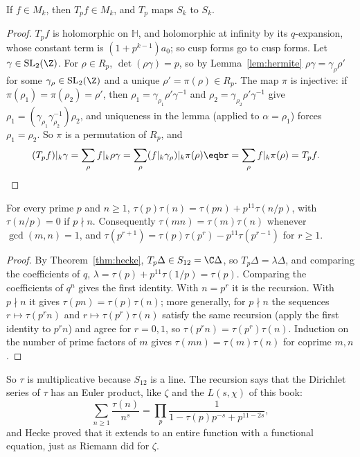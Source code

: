 \begin{theorem}[Hecke]\label{thm:hecke}
If $f\in M_k$, then $T_pf\in M_k$, and $T_p$ maps $S_k$ to $S_k$.
\end{theorem}

\begin{proof}
$T_pf$ is holomorphic on $\mathbb H$, and holomorphic at infinity by its $q$-expansion, whose constant term is $(1+p^{k-1})a_0$; so cusp forms go to cusp forms. Let $\gamma\in\mathrm{SL}_2(\Z)$. For $\rho\in R_p$, $\det(\rho\gamma)=p$, so by
Lemma~\ref{lem:hermite} $\rho\gamma=\gamma_\rho\rho'$ for some $\gamma_\rho\in\mathrm{SL}_2(\Z)$ and a unique $\rho'=\pi(\rho)\in R_p$. The map $\pi$ is injective: if $\pi(\rho_1)=\pi(\rho_2)=\rho'$, then $\rho_1=\gamma_{\rho_1}\rho'\gamma^{-1}$ and
$\rho_2=\gamma_{\rho_2}\rho'\gamma^{-1}$ give $\rho_1=(\gamma_{\rho_1}\gamma_{\rho_2}^{-1})\rho_2$, and uniqueness in the lemma (applied to $\alpha=\rho_1$) forces $\rho_1=\rho_2$. So $\pi$ is a permutation of $R_p$, and
\[
\begin{aligned}(T_pf)|_k\gamma&=\sum_\rho f|_k\rho\gamma=\sum_\rho(f|_k\gamma_\rho)|_k\pi(\rho)\eqbr=\sum_\rho f|_k\pi(\rho)=T_pf.\end{aligned}
\]
\end{proof}

\begin{theorem}[Mordell, 1917]\label{thm:mordell}
For every prime $p$ and $n\ge1$, $\tau(p)\tau(n)=\tau(pn)+p^{11}\tau(n/p)$, with $\tau(n/p)=0$ if $p\nmid n$. Consequently $\tau(mn)=\tau(m)\tau(n)$ whenever $\gcd(m,n)=1$, and
$\tau(p^{r+1})=\tau(p)\tau(p^r)-p^{11}\tau(p^{r-1})$ for $r\ge1$.
\end{theorem}

\begin{proof}
By Theorem~\ref{thm:hecke}, $T_p\Delta\in S_{12}=\C\Delta$, so $T_p\Delta=\lambda\Delta$, and comparing the coefficients of $q$, $\lambda=\tau(p)+p^{11}\tau(1/p)=\tau(p)$. Comparing the coefficients of $q^n$ gives the first identity.
With $n=p^r$ it is the recursion. With $p\nmid n$ it gives $\tau(pn)=\tau(p)\tau(n)$; more generally, for $p\nmid n$ the sequences $r\mapsto\tau(p^rn)$ and $r\mapsto\tau(p^r)\tau(n)$ satisfy the same recursion (apply the first identity to $p^rn$)
and agree for $r=0,1$, so $\tau(p^rn)=\tau(p^r)\tau(n)$. Induction on the number of prime factors of $m$ gives $\tau(mn)=\tau(m)\tau(n)$ for coprime $m,n$.
\end{proof}

So $\tau$ is multiplicative because $S_{12}$ is a line. The recursion says that the Dirichlet series of $\tau$ has an Euler product, like $\zeta$ and the $L(s,\chi)$ of this book:
\[
\sum_{n\ge1}\frac{\tau(n)}{n^s}=\prod_p\frac1{1-\tau(p)p^{-s}+p^{11-2s}},
\]
and Hecke proved that it extends to an entire function with a functional equation, just as Riemann did for $\zeta$.

